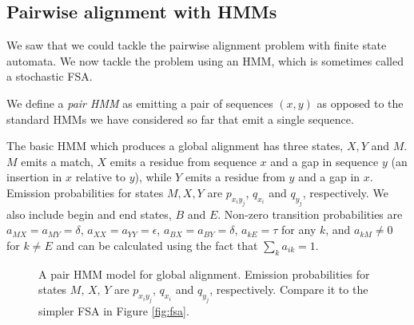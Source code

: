 \documentclass[11pt]{article}
\begin{document}
\subsection{Pairwise alignment with HMMs}

We saw that we could tackle the pairwise alignment problem with finite  state automata.  We now tackle  the problem using an HMM, which is sometimes called a stochastic FSA.   

We define a {\em pair HMM} as emitting a pair of sequences $(x,y)$ as opposed to the standard HMMs we have considered so far that emit a single sequence.  



The basic HMM which produces a global alignment has three states, $X, Y$ and $M$.  $M$ emits a match, $X$ emits a residue from sequence $x$ and a gap in sequence $y$ (an insertion in $x$ relative to $y$), while $Y$ emits a residue from $y$ and a gap in $x$.   Emission probabilities for states $M,X, Y$ are $p_{x_iy_j}$, $q_{x_i}$ and $q_{y_j}$, respectively.   We also include begin and end states, $B$ and $E$.  Non-zero transition probabilities are $a_{MX} = a_{MY} = \delta$, $a_{XX} = a_{YY} = \epsilon$, $a_{BX} = a_{BY} = \delta$, $a_{kE} = \tau$ for any $k$,  and $a_{kM} \neq 0$ for $k \neq E$ and can be calculated using the fact that $\sum_{k} a_{ik} = 1$.
\begin{figure}
\centering
{}
 \vspace{-1.5cm}
 \caption{A pair HMM model for global alignment. Emission probabilities for states $M, \, X, \, Y$ are $p_{x_iy_j}$, $q_{x_i}$ and $q_{y_j}$, respectively. Compare it to the simpler FSA in Figure \ref{fig:fsa}.}
 \label{fig:pairhmm}
 \end{figure}
\end{document}
